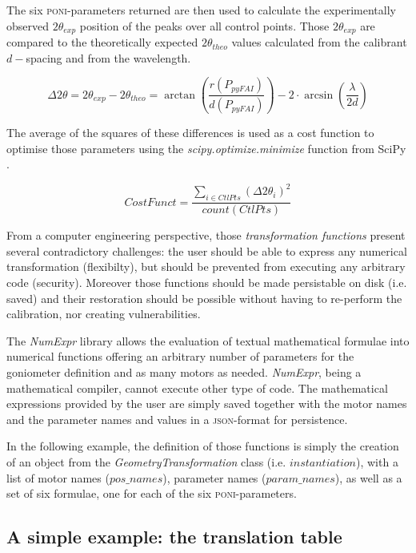 \documentclass[preprint]{iucr}              %
\begin{document}
The six \textsc{poni}-parameters returned 
are then used to
calculate the experimentally observed $2\theta_{exp}$ position of the peaks over all control
points.
Those $2\theta_{exp}$ are compared to
the theoretically expected $2\theta_{theo}$ values calculated from the calibrant $d-$spacing and
from the wavelength.

\begin{equation}
\Delta 2\theta = 2\theta _{exp} - 2\theta _{theo} =
\arctan(\frac{r(P_{pyFAI})}{d(P_{pyFAI})}) -  2 \cdot
\arcsin(\frac{\lambda}{2d})
\end{equation}


The average of the squares of these differences is used as a cost function
to optimise those parameters using the \textit{scipy.optimize.minimize}
function from SciPy \cite{scipy}.

\begin{equation}
CostFunct = \frac{ \sum\limits_{i \in CtlPts} {(\Delta 2\theta_i)^2}}
{count(CtlPts)} 
\end{equation}

From a computer engineering perspective, 
those \textit{transformation functions} present several contradictory challenges: 
the user should be able to express any numerical transformation (flexibilty),
but should be prevented from executing any arbitrary code (security).  
Moreover those functions should be made persistable on disk (i.e. saved) and 
their restoration should be possible without having to re-perform the calibration, nor 
creating vulnerabilities. 

The \textit{NumExpr} library \cite{numexpr} allows the evaluation of 
textual mathematical formulae into numerical
functions offering an arbitrary number of parameters for 
the goniometer definition and as many motors as needed.
\textit{NumExpr}, being a mathematical compiler, cannot execute other type of code. 
The mathematical expressions provided by the user are simply saved together with the motor names 
and the parameter names and values in a \textsc{json}-format \cite{json} for persistence.

In the following example, the definition of those functions is simply the creation 
of an object from the 
\textit{GeometryTransformation} class (i.e. $instantiation$), with a list of
motor names ($pos\_names$), parameter names ($param\_names$), as well as a set of six formulae, 
one for each of the six \textsc{poni}-parameters.

\subsection{A simple example: the translation table}
\end{document}
